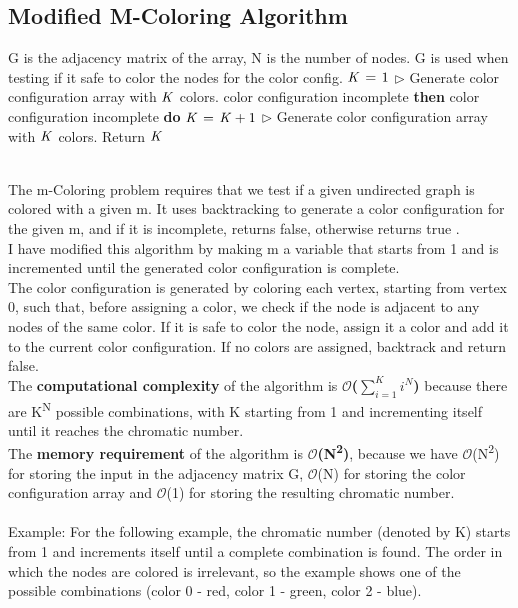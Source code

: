 \documentclass[12pt]{article}
\begin{document}
\subsection{Modified M-Coloring Algorithm}
\begin{codebox}
\li \Comment G is the adjacency matrix of the array, N is the number of nodes.
\li \Comment G is used when testing if it safe to color the nodes for the color config.
\li $\id{K} \gets 1$
\li $\rhd$ Generate color configuration array with $\id{K}$ colors.
\li \If color configuration incomplete {\bf then}
\li \Do \While color configuration incomplete {\bf do}
\li \Do $\id{K}  \gets \id{K} + 1$
\li $\rhd$ Generate color configuration array with $\id{K}$ colors. \End \End
\li Return $\id{K}$
\End 
\end{codebox} \quad \\
\indent The m-Coloring problem requires that we test if a given undirected graph is colored with a given m. It uses backtracking to generate a color configuration for the given m, and if it is incomplete, returns false, otherwise returns true \cite{m-col}. \\ 
\indent I have modified this algorithm by making m a variable that starts from 1 and is incremented until the generated color configuration is complete. \\
\indent The color configuration is generated by coloring each vertex, starting from vertex 0, such that, before assigning a color, we check if the node is adjacent to any nodes of the same color. If it is safe to color the node, assign it a color and add it to the current color configuration. If no colors are assigned, backtrack and return false. \\
\indent The {\bf computational complexity} of the algorithm is {\bf $\mathcal{O}$($\sum_{i=1}^{K} i^N$) } because there are K\textsuperscript{N} possible combinations, with K starting from 1 and incrementing itself until it reaches the chromatic number.\\
\indent The {\bf memory requirement} of the algorithm is {\bf $\mathcal{O}$(N\textsuperscript{2})}, because we have $\mathcal{O}$(N\textsuperscript{2}) for storing the input in the adjacency matrix G, $\mathcal{O}$(N) for storing the color configuration array and $\mathcal{O}$(1) for storing the resulting chromatic number. \\ \\ Example: For the following example, the chromatic number (denoted by K) starts from 1 and increments itself until a complete combination is found. The order in which the nodes are colored is irrelevant, so the example shows one of the possible combinations (color 0 - red, color 1 - green, color 2 - blue). \\
\end{document}
